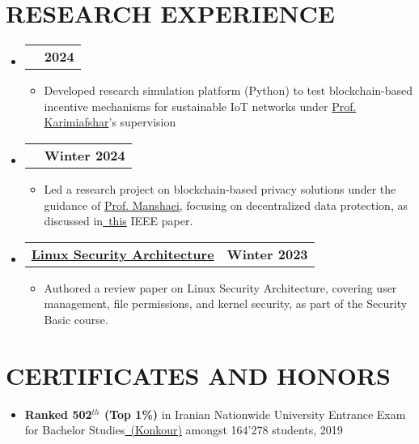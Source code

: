 \documentclass[letterpaper,11pt]{article}
\makeatletter
\newcommand{\resumeItem}[1]{
  \item\small{
    {#1 \vspace{-2pt}}
  }
}
\newcommand{\resumeProjectHeading}[2]{
    \item
    \begin{tabular*}{1.001\textwidth}{l@{\extracolsep{\fill}}r}
      \small#1 & \textbf{\small #2}\\
    \end{tabular*}\vspace{-7pt}
}
\newcommand{\resumeSubHeadingListStart}{\begin{itemize}[leftmargin=0.0in, label={}]}
\newcommand{\resumeSubHeadingListEnd}{\end{itemize}}
\newcommand{\resumeItemListStart}{\begin{itemize}}
\newcommand{\resumeItemListEnd}{\end{itemize}\vspace{-5pt}}
\makeatother
\begin{document}
\vspace{-11pt}


\section{RESEARCH EXPERIENCE}
	\vspace{-5pt}
    \resumeSubHeadingListStart
    \resumeProjectHeading
	{\href{https://github.com/MohammadmahdiAhmadi/IoTBlockSim}{\color{blue}{\textbf{IoTBlockSim}}}} {2024}
	\resumeItemListStart
	\resumeItem{Developed research simulation platform (Python) to 	test blockchain-based incentive mechanisms for sustainable IoT 	networks under \href{https://karimiafshar.iut.ac.ir/}{\color{blue}Prof. Karimiafshar}'s supervision}
	\resumeItemListEnd
	\vspace{-15pt}

    \resumeProjectHeading
      {\href{https://ieeexplore.ieee.org/stamp/stamp.jsp?tp=\&arnumber=7163223}{\color{blue}{\textbf{Decentralizing Privacy: Using Blockchain to Protect Personal Data}}}}{Winter 2024}
      \resumeItemListStart
        \resumeItem{Led a research project on blockchain-based privacy solutions under the guidance of \href{https://scholar.google.com/citations?user=33d716cAAAAJ&hl=en}{\color{blue}Prof. Manshaei}, focusing on decentralized data protection, as discussed in\href{https://ieeexplore.ieee.org/stamp/stamp.jsp?tp=&arnumber=7163223}{\raisebox{-0.2\height}\ \color{blue}this} IEEE paper.}
      \resumeItemListEnd
	\vspace{-15pt}

    \resumeProjectHeading
      {\href{https://github.com/MohammadmahdiAhmadi/LinuxSecurity-Review/blob/main/2023_A_Review_of_Linux_Security_Architecture.pdf}{\color{blue}\textbf{Linux Security Architecture}}}{Winter 2023}
      \resumeItemListStart
        \resumeItem{Authored a review paper on Linux Security Architecture, covering user management, file permissions, and kernel security, as part of the Security Basic course.}
      \resumeItemListEnd
    \resumeSubHeadingListEnd

\vspace{-8pt}
\section{CERTIFICATES AND HONORS}
\vspace{2pt}
  \begin{itemize}
    \item \textbf{Ranked 502$^{th}$ (Top 1\%)} in Iranian Nationwide University Entrance Exam for Bachelor Studies\href{https://en.wikipedia.org/wiki/Iranian_University_Entrance_Exam}{\raisebox{-0.2\height}\ \color{blue}(Konkour)} amongst 164’278 students, 2019
  \end{itemize}
\end{document}

